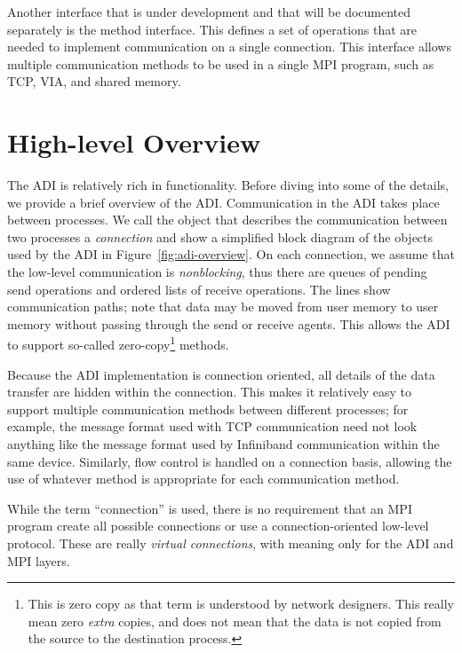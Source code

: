 Another interface that is under development and that will be
documented separately is the method interface.  This defines 
a set of operations that are needed to implement communication on a
single connection.  This interface allows multiple communication
methods to be used in a single MPI program, such as TCP, VIA, and
shared memory.  

\section{High-level Overview}
\label{sec:high-level}

The ADI is relatively rich in functionality.  Before diving into some of the
details, we provide a brief overview of the ADI.
Communication in the ADI takes place between processes.  We call the object
that describes the communication between two processes a
\emph{connection}
and show a simplified block diagram of the objects used by the ADI in
Figure~\ref{fig:adi-overview}.
On each connection, we assume that the low-level communication is
\emph{nonblocking}, thus there are queues of pending send operations and
ordered lists of receive operations.  The lines show communication paths; note
that data may be moved from user memory to user memory without passing through
the send or receive agents.  This allows the ADI to support so-called
zero-copy\footnote{This is zero copy as that term is understood by
  network designers.  This really mean zero \emph{extra} copies, and
  does not mean that the data is not copied from the source to the
  destination process.} methods.

Because the ADI implementation is connection oriented, all details of the data
transfer are hidden within the connection.  This makes it relatively easy to
support multiple communication methods between different processes; for
example, the message format used with TCP communication need not look anything
like the message format used by Infiniband communication within the
same device. 
Similarly, flow control is handled on a connection basis, allowing the use of
whatever method is appropriate for each communication method.
%

While the term ``connection'' is used, there is no requirement that an MPI
program create all possible connections or use a connection-oriented low-level
protocol.  These are really \emph{virtual connections}, with meaning only for
the ADI and MPI layers.

